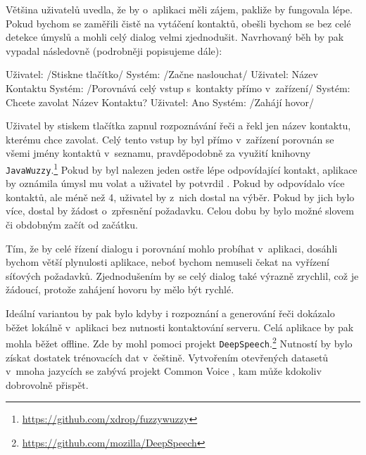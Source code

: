 Většina uživatelů uvedla, že by o~aplikaci měli zájem, pakliže by fungovala
lépe. Pokud bychom se zaměřili čistě na vytáčení kontaktů, obešli bychom se
bez celé detekce úmyslů a mohli celý dialog velmi zjednodušit.
Navrhovaný běh by pak vypadal následovně (podrobněji popisujeme dále):
\begin{code}
    Uživatel: /Stiskne tlačítko/
    Systém:   /Začne naslouchat/
    Uživatel: Název Kontaktu
    Systém:   /Porovnává celý vstup s~kontakty přímo v~zařízení/
    Systém:   Chcete zavolat Název Kontaktu?
    Uživatel: Ano
    Systém:   /Zahájí hovor/
\end{code}
Uživatel by stiskem
tlačítka zapnul rozpoznávání řeči a řekl jen název kontaktu,
kterému chce zavolat. Celý tento vstup by byl přímo v~zařízení
porovnán se všemi jmény kontaktů v~seznamu, pravděpodobně za
využití knihovny \texttt{JavaWuzzy}.\footnote{\url{https://github.com/xdrop/fuzzywuzzy}} Pokud by byl
nalezen jeden ostře lépe odpovídající kontakt, aplikace
by oznámila úmysl mu volat a uživatel by potvrdil .
Pokud by odpovídalo více kontaktů, ale méně než 4, uživatel
by z~nich dostal na výběr. Pokud by jich bylo více, dostal by
žádost o~zpřesnění požadavku. Celou dobu by bylo možné slovem
 či obdobným začít od začátku.

Tím, že by celé řízení dialogu i porovnání mohlo probíhat v~aplikaci,
dosáhli bychom větší plynulosti aplikace, neboť bychom nemuseli čekat
na vyřízení síťových požadavků. Zjednodušením by se celý dialog také
výrazně zrychlil, což je žádoucí, protože zahájení hovoru by mělo
být rychlé.

Ideální variantou by pak bylo kdyby i rozpoznání a generování řeči
dokázalo běžet lokálně v~aplikaci bez nutnosti kontaktování serveru.
Celá aplikace by pak mohla běžet offline. Zde by mohl pomoci projekt
\texttt{DeepSpeech}.\footnote{\url{https://github.com/mozilla/DeepSpeech}}
Nutností by bylo získat dostatek trénovacích dat v~češtině. Vytvořením
otevřených datasetů v~mnoha jazycích se zabývá projekt Common Voice \citep{commonvoice_2020},
kam může kdokoliv dobrovolně přispět.